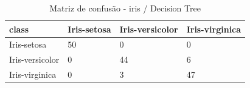 \begin{table}[htbp]
\centering
\begin{tabular}{llll}
\hline
class & Iris-setosa & Iris-versicolor & Iris-virginica \\
\hline
Iris-setosa & 50 & 0 & 0 \\
Iris-versicolor & 0 & 44 & 6 \\
Iris-virginica & 0 & 3 & 47 \\
\hline
\end{tabular}
\caption{Matriz de confusão - iris / Decision Tree}
\label{tab:ex3-iris-decision-tree-cm}
\end{table}